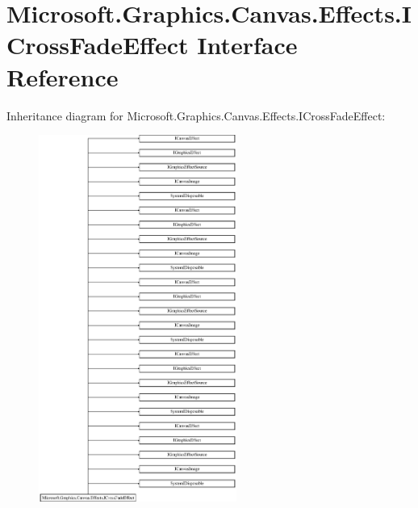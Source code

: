 \hypertarget{interface_microsoft_1_1_graphics_1_1_canvas_1_1_effects_1_1_i_cross_fade_effect}{}\section{Microsoft.\+Graphics.\+Canvas.\+Effects.\+I\+Cross\+Fade\+Effect Interface Reference}
\label{interface_microsoft_1_1_graphics_1_1_canvas_1_1_effects_1_1_i_cross_fade_effect}
Inheritance diagram for Microsoft.\+Graphics.\+Canvas.\+Effects.\+I\+Cross\+Fade\+Effect\+:\begin{figure}[H]
\begin{center}
\leavevmode
\includegraphics[height=12.000000cm]{interface_microsoft_1_1_graphics_1_1_canvas_1_1_effects_1_1_i_cross_fade_effect}
\end{center}
\end{figure}
